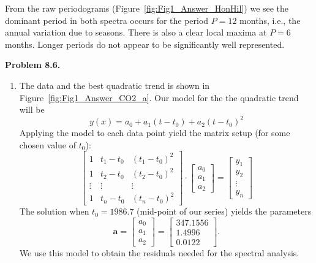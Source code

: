 From the raw periodograms (Figure~\ref{fig:Fig1_Answer_HonHil}) we see the dominant period in both spectra occurs for the period $P = 12$ months,
i.e., the annual variation due to seasons.  There is also a clear local maxima at $P = 6$ months.  Longer periods
do not appear to be significantly well represented.


\noindent
\bf{Problem 8.6.} \\
\begin{enumerate}[label=\alph*)]
\item  The data and the best quadratic trend is shown in Figure~\ref{fig:Fig1_Answer_CO2_a}.
Our model for the the quadratic trend will be
$$
y(x) = a_0 + a_1 (t-t_0) + a_2 (t-t_0)^2
$$
Applying the model to each data point yield the matrix setup (for some chosen value of $t_0$):
$$
\left [ \begin{array}{ccc}
1 & t_1-t_0 & (t_1-t_0)^2 \\
1 & t_2-t_0 & (t_2-t_0)^2 \\
\vdots & \vdots & \vdots \\
1 & t_n-t_0 & (t_n-t_0)^2
\end{array} \right ] \cdot \left [
\begin{array}{c}
a_0 \\
a_1 \\
a_2
\end{array} \right ] = \left [
\begin{array}{c}
y_1 \\
y_2 \\
\vdots \\
y_n
\end{array} \right ]
$$
The solution when $t_0 = 1986.7$ (mid-point of our series) yields the parameters
$$
\mathbf{a} =  \left [
\begin{array}{c}
a_0 \\
a_1 \\
a_2
\end{array} \right ]
=  \left [
\begin{array}{r}
347.1556 \\
 1.4996 \\
 0.0122
\end{array} \right ].
$$
We use this model to obtain the residuals needed for the spectral analysis.


\end{enumerate}
